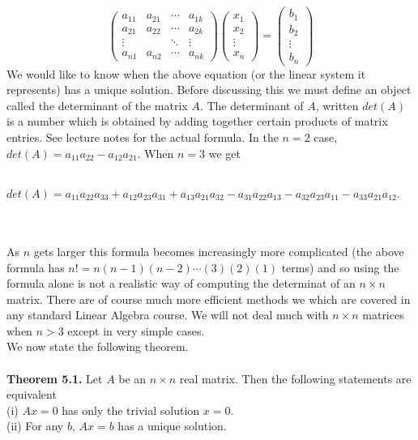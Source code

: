 \documentclass{amsart}
\begin{document}
\begin{equation*}
 \begin{pmatrix}
 a_{11}&a_{21}&\cdots& a_{1k}\\
 a_{21}&a_{22}&\cdots& a_{2k}\\
 \vdots&&\ddots&\vdots\\
 a_{n1}&a_{n2}&\cdots& a_{nk}
 \end{pmatrix}
\begin{pmatrix}
 x_1\\
 x_2\\
 \vdots\\
 x_n
 \end{pmatrix}
=
\begin{pmatrix}
 b_1\\
 b_2\\
 \vdots\\
 b_n
 \end{pmatrix}
 \end{equation*}
We would like to know when the above equation (or the linear system it represents) has a unique solution. Before discussing this we must define an object called the determinant of the matrix $A$. The determinant of $A$, written $det(A)$ is a number which is obtained by adding together certain products of matrix entries. See lecture notes for the actual formula. In the $n=2$ case, $det(A)=a_{11}a_{22}-a_{12}a_{21}$. When $n=3$ we get\\\\
\centerline{$det(A)=a_{11}a_{22}a_{33}+a_{12}a_{23}a_{31}+a_{13}a_{21}a_{32}-a_{31}a_{22}a_{13}-a_{32}a_{23}a_{11}-a_{33}a_{21}a_{12}.$} 
\\
\\
As $n$ gets larger this formula becomes increasingly more complicated (the above formula has $n!=n(n-1)(n-2)\cdots(3)(2)(1)$ terms) and so using the formula alone is not a realistic way of computing the determinat of an $n\times n$ matrix. There are of course much more efficient methods we which are covered in any standard Linear Algebra course. We will not deal much with $n\times n$ matrices when $n>3$ except in very simple cases.\\
We now state the following theorem.\\\\
{\bf Theorem 5.1.} Let $A$ be an $n\times n$ real matrix. Then the following statements are equivalent\\
(i) $Ax=0$ has only the trivial solution $x=0$.\\
(ii) For any $b$, $Ax=b$ has a unique solution.\\
\end{document}
